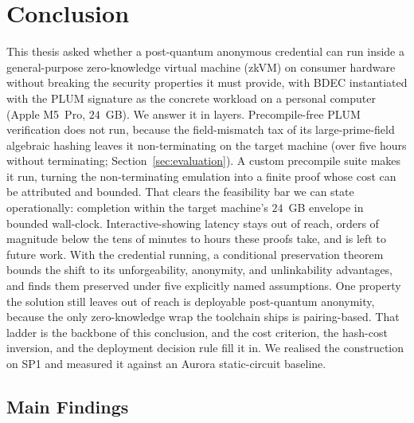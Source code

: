 \section{Conclusion}\label{sec:conclusion}
This thesis asked whether a post-quantum anonymous credential can run inside a general-purpose zero-knowledge virtual machine (zkVM) on consumer hardware without breaking the security properties it must provide, with BDEC instantiated with the PLUM signature as the concrete workload on a personal computer (Apple M5~Pro, $24$~GB). We answer it in layers. Precompile-free PLUM verification does not run, because the field-mismatch tax of its large-prime-field algebraic hashing leaves it non-terminating on the target machine (over five hours without terminating; Section~\ref{sec:evaluation}). A custom precompile suite makes it run, turning the non-terminating emulation into a finite proof whose cost can be attributed and bounded. That clears the feasibility bar we can state operationally: completion within the target machine's $24$~GB envelope in bounded wall-clock. Interactive-showing latency stays out of reach, orders of magnitude below the tens of minutes to hours these proofs take, and is left to future work. With the credential running, a conditional preservation theorem bounds the shift to its unforgeability, anonymity, and unlinkability advantages, and finds them preserved under five explicitly named assumptions. One property the solution still leaves out of reach is deployable post-quantum anonymity, because the only zero-knowledge wrap the toolchain ships is pairing-based. That ladder is the backbone of this conclusion, and the cost criterion, the hash-cost inversion, and the deployment decision rule fill it in. We realised the construction on SP1 and measured it against an Aurora static-circuit baseline.

\subsection{Main Findings}\label{subsec:conclusion-findings}
